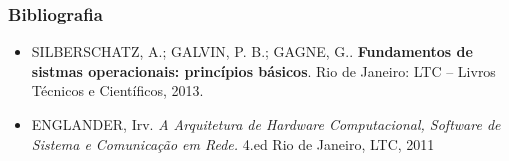 \documentclass[aspectratio=169,
				xcolor=table]{beamer}
\begin{document}
	\begin{frame}
		\frametitle{Bibliografia}
		\begin{itemize}
			\item SILBERSCHATZ, A.; GALVIN, P. B.; GAGNE, G.. \textbf{Fundamentos de sistmas operacionais: princípios básicos}. Rio de Janeiro: LTC – Livros Técnicos e Científicos, 2013.


			\item ENGLANDER, Irv. \textit{A Arquitetura de Hardware Computacional, Software de Sistema e Comunicação em Rede.} 4.ed Rio de Janeiro, LTC, 2011

		\end{itemize}
	\end{frame}
	
	\begin{frame}{}
		
	\end{frame}
	
\end{document}
